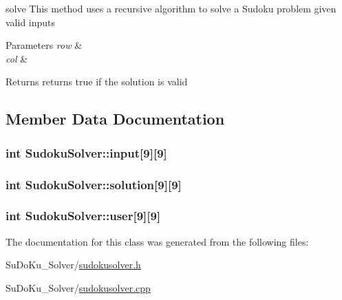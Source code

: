 solve This method uses a recursive algorithm to solve a Sudoku problem given valid inputs 


\begin{DoxyParams}{Parameters}
{\em row} & \\
\hline
{\em col} & \\
\hline
\end{DoxyParams}
\begin{DoxyReturn}{Returns}
returns true if the solution is valid 
\end{DoxyReturn}


\subsection{Member Data Documentation}
\subsubsection[{\texorpdfstring{input}{input}}]{\setlength{\rightskip}{0pt plus 5cm}int Sudoku\+Solver\+::input\mbox{[}9\mbox{]}\mbox{[}9\mbox{]}}\hypertarget{class_sudoku_solver_a5623374dbdea1eb6aaa857521e8ff6c2}{}\label{class_sudoku_solver_a5623374dbdea1eb6aaa857521e8ff6c2}
\subsubsection[{\texorpdfstring{solution}{solution}}]{\setlength{\rightskip}{0pt plus 5cm}int Sudoku\+Solver\+::solution\mbox{[}9\mbox{]}\mbox{[}9\mbox{]}}\hypertarget{class_sudoku_solver_a1aca7fe43c36b2eb07a1357f76c728d4}{}\label{class_sudoku_solver_a1aca7fe43c36b2eb07a1357f76c728d4}
\subsubsection[{\texorpdfstring{user}{user}}]{\setlength{\rightskip}{0pt plus 5cm}int Sudoku\+Solver\+::user\mbox{[}9\mbox{]}\mbox{[}9\mbox{]}}\hypertarget{class_sudoku_solver_a6e2f7ae7438f42979bcbd9cee385b24c}{}\label{class_sudoku_solver_a6e2f7ae7438f42979bcbd9cee385b24c}


The documentation for this class was generated from the following files\+:\begin{DoxyCompactItemize}
\item 
Su\+Do\+Ku\+\_\+\+Solver/\hyperlink{sudokusolver_8h}{sudokusolver.\+h}\item 
Su\+Do\+Ku\+\_\+\+Solver/\hyperlink{sudokusolver_8cpp}{sudokusolver.\+cpp}\end{DoxyCompactItemize}
